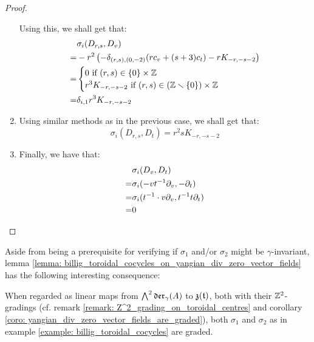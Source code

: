 \begin{proof}
\begin{enumerate}
                    Using this, we shall get that:
                        $$
                            \begin{aligned}
                                & \sigma_i(D_{r, s}, D_v)
                                \\
                                = & -r^2 \left( -\delta_{(r, s), (0, -2)} ( r c_v + (s + 3) c_t ) - r K_{-r, -s - 2} \right)
                                \\
                                = &
                                \begin{cases}
                                    \text{$0$ if $(r, s) \in \{0\} \x \Z$}
                                    \\
                                    \text{$r^3 K_{-r, -s - 2}$ if $(r, s) \in (\Z \setminus \{0\}) \x \Z$}
                                \end{cases}
                                \\
                                = & \delta_{i, 1} r^3 K_{-r, -s - 2}
                            \end{aligned}
                        $$
                    \item Using similar methods as in the previous case, we shall get that:
                        $$\sigma_i(D_{r, s}, D_t) = r^2s K_{-r, -s - 2}$$
                    \item Finally, we have that:
                        $$
                            \begin{aligned}
                                & \sigma_i(D_v, D_t)
                                \\
                                = & \sigma_i(-v t^{-1} \partial_v, -\partial_t)
                                \\
                                = & \sigma_i(t^{-1} \cdot v \partial_v, t^{-1} t \partial_t)
                                \\
                                = & 0
                            \end{aligned}
                        $$
                \end{enumerate}
            \end{proof}
        Aside from being a prerequisite for verifying if $\sigma_1$ and/or $\sigma_2$ might be $\gamma$-invariant, lemma \ref{lemma: billig_toroidal_cocycles_on_yangian_div_zero_vector_fields} has the following interesting consequence:
        \begin{corollary} \label{coro: billig_toroidal_cocycles_are_graded}
            When regarded as linear maps from $\bigwedge^2 \mathfrak{der}_{\gamma}(A)$ to $\mathfrak{z}(\mathfrak{t})$, both with their $\mathbb{Z}^2$-gradings (cf. remark \ref{remark: Z^2_grading_on_toroidal_centres} and corollary \ref{coro: yangian_div_zero_vector_fields_are_graded}), both $\sigma_1$ and $\sigma_2$ as in example \ref{example: billig_toroidal_cocycles} are graded. 
        \end{corollary}
